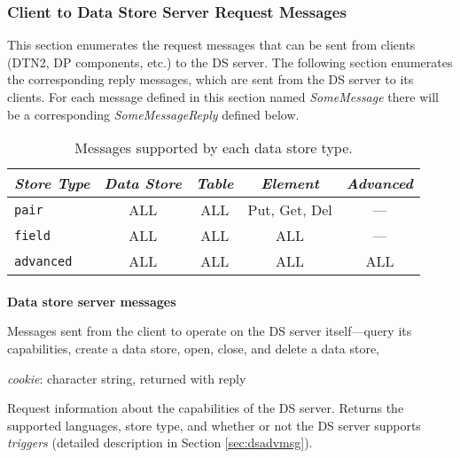 \subsubsection{Client to Data Store Server Request Messages}

This section enumerates the request messages that can be sent from
clients (DTN2, DP components, etc.) to the DS
server. The following section enumerates the corresponding reply
messages, which are sent from the DS server to its clients. 
For each message defined in this section named {\em SomeMessage}
there will be a corresponding {\em SomeMessageReply} defined below.

\begin{table}
\centering
\begin{tabular}{|l|c|c|c|c|}
\hline
{\em Store Type} & {\em Data Store} & {\em Table} & {\em Element} & {\em Advanced} \\ \hline \hline
{\tt pair} & ALL & ALL & Put, Get, Del & --- \\ \hline
{\tt field} & ALL & ALL & ALL & --- \\ \hline
{\tt advanced} & ALL & ALL & ALL & ALL \\ \hline
\end{tabular}
\caption{\label{table:supported-messages} Messages supported by each data store type.}
\end{table}

\paragraph {}
{\bf Data store server messages}

Messages sent from the client to operate on the DS server
itself---query its capabilities, create a data store, open, close, and
delete a data store, 

{
\metP
    {\em cookie}: character string, returned with reply

\metD
    Request information about the capabilities of the DS server.
    Returns the supported languages, store type, and whether or not
    the DS server supports {\em triggers} (detailed description in
    Section \ref{sec:dsadvmsg}).
}


